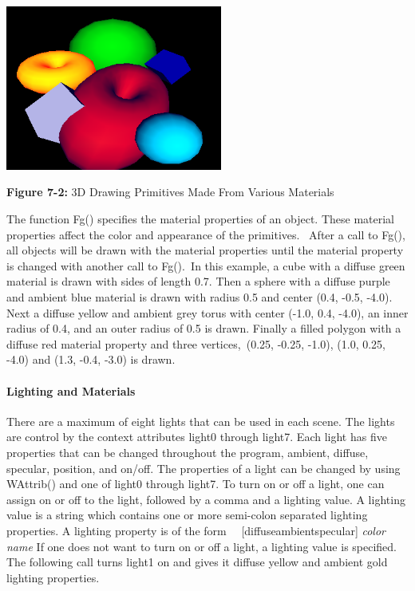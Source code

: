 
\includegraphics[width=2.8071in,height=2.1335in]{ub-img/ub-img32.png} 

{\sffamily\bfseries Figure 7-2:}
{\sffamily 3D Drawing Primitives Made From Various Materials}

\bigskip

The function Fg() specifies the material properties of an object. These
material properties affect the color and appearance of the primitives.
\ After a call to Fg(), all objects will be drawn with the material
properties until the material property is changed with another call to
Fg().\texttt{ }In this example, a cube with a diffuse green material is
drawn with sides of length 0.7. Then a sphere with a diffuse purple and
ambient blue material is drawn with radius 0.5 and center (0.4, -0.5,
-4.0). Next a diffuse yellow and ambient grey torus with center (-1.0,
0.4, -4.0), an inner radius of 0.4, and an outer radius of 0.5 is
drawn. Finally a filled polygon with a diffuse red material property
and three vertices,\texttt{ }(0.25, -0.25, -1.0), (1.0, 0.25, -4.0) and
(1.3, -0.4, -3.0) is drawn. 

\paragraph{Lighting and Materials}
There are a maximum of eight lights that can be used in each scene. The
lights are control by the context attributes light0 through light7.
Each light has five properties that can be changed throughout the
program, ambient, diffuse, specular, position, and on/off. The
properties of a light can be changed by using WAttrib() and one of
light0 through light7. To turn on or off a light, one can assign on
or off to the light, followed by a comma and a lighting value. A
lighting value is a string which contains one or more semi-colon
separated lighting properties. A lighting property is of the form
\newline
 \ \ [diffuse{\textbar}ambient{\textbar}specular] \textit{color
name}\newline
If one does not want to turn on or off a light, a lighting value is
specified. The following call turns light1 on and gives it diffuse
yellow and ambient gold lighting properties. 


